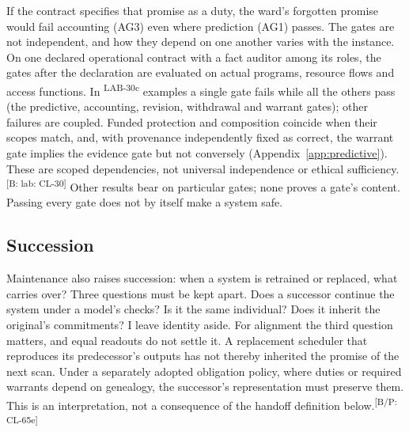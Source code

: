\documentclass[pdflatex,sn-basic]{sn-jnl}%
\newcommand{\slot}[1]{}%
\newcommand{\claim}[2]{\ifannotated\textsuperscript{\textcolor{blue!60!black}{\tiny[#1: #2]}}\fi}
\newcommand{\rec}[1]{\ifannotated\textsuperscript{\textcolor{blue!60!black}{\tiny#1}}\fi}
\begin{document}
If the contract specifies that promise as a duty, the ward's forgotten promise would fail accounting (AG3) even where prediction (AG1) passes. The gates are not independent, and how they depend on one another varies with the instance. On one declared operational contract with a fact auditor among its roles, the gates after the declaration are evaluated on actual programs, resource flows and access functions. In \numCOneIsolatedFailures\rec{LAB-30c} examples a single gate fails while all the others pass (the predictive, accounting, revision, withdrawal and warrant gates); other failures are coupled. Funded protection and composition coincide when their scopes match, and, with provenance independently fixed as correct, the warrant gate implies the evidence gate but not conversely (Appendix~\ref{app:predictive}). These are scoped dependencies, not universal independence or ethical sufficiency.\claim{B: lab}{CL-30} Other results bear on particular gates; none proves a gate's content. Passing every gate does not by itself make a system safe.

\subsection{Succession}\label{sec:succession}

\slot{4.4}
Maintenance also raises succession: when a system is retrained or replaced, what carries over? Three questions must be kept apart. Does a successor continue the system under a model's checks? Is it the same individual? Does it inherit the original's commitments? I leave identity aside. For alignment the third question matters, and equal readouts do not settle it. A replacement scheduler that reproduces its predecessor's outputs has not thereby inherited the promise of the next scan. Under a separately adopted obligation policy, where duties or required warrants depend on genealogy, the successor's representation must preserve them. This is an interpretation, not a consequence of the handoff definition below.\claim{B/P}{CL-65e}
\end{document}
